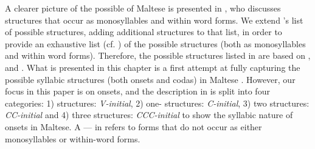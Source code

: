 \documentclass[output=paper]{langsci/langscibook}
\begin{document}
A clearer picture of the possible  of Maltese is presented in \citep[48]{camilleri2014stem}, who discusses  structures that occur as monosyllables and within word forms. We extend \citet{camilleri2014stem}’s list of possible  structures, adding additional structures to that list, in order to provide an exhaustive list (cf. ) of the possible  structures (both as monosyllables and within word forms). Therefore, the possible  structures listed in  are based on \citet{azzopardi1981phonetics}, \citet{maltese_book} and \citet{camilleri2014stem}. What is presented in this chapter is a first attempt at fully capturing the possible syllabic structures (both onsets and codas) in Maltese \citep[some of this work appears in][]{lukediss}. However, our focus in this paper is on onsets, and the description in  is split into four categories: 1)  structures: \textit{V-initial}, 2) one-  structures: \textit{C-initial}, 3) two   structures: \textit{CC-initial} and 4) three   structures: \textit{CCC-initial} to show the syllabic nature of onsets in Maltese. A --- in  refers to forms that do not occur as either monosyllables or within-word forms.
\end{document}
